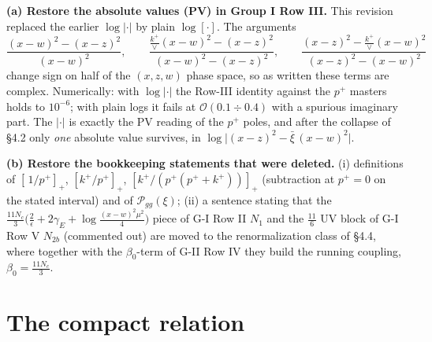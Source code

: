 \documentclass[11pt]{article}
\newcommand{\xib}{\bar{\xi}}
\begin{document}
\textbf{(a) Restore the absolute values (PV) in Group I Row III.}
This revision replaced the earlier $\log|\cdot|$ by plain $\log[\cdot]$. The arguments
\[
\frac{(x-w)^{2}-(x-z)^{2}}{(x-w)^{2}},\qquad
\frac{\frac{k^{+}}{\vee}(x-w)^{2}-(x-z)^{2}}{(x-w)^{2}-(x-z)^{2}},\qquad
\frac{(x-z)^{2}-\frac{k^{+}}{\vee}(x-w)^{2}}{(x-z)^{2}-(x-w)^{2}}
\]
change sign on half of the $(x,z,w)$ phase space, so as written these terms are complex.
Numerically: with $\log|\cdot|$ the Row-III identity against the $p^{+}$ masters holds to
$10^{-6}$; with plain logs it fails at $\mathcal O(0.1\div0.4)$ with a spurious imaginary
part. The $|\cdot|$ is exactly the PV reading of the $p^{+}$ poles, and after the collapse
of \S4.2 only \emph{one} absolute value survives, in
$\log\big|(x-z)^{2}-\xib\,(x-w)^{2}\big|$.

\textbf{(b) Restore the bookkeeping statements that were deleted.}
(i) definitions of $[\,1/p^{+}]_{+}$, $[k^{+}/p^{+}]_{+}$,
$[k^{+}/(p^{+}(p^{+}+k^{+}))]_{+}$ (subtraction at $p^{+}=0$ on the stated interval) and of
$\mathcal P_{gg}(\xi)$;
(ii) a sentence stating that the $\frac{11N_{c}}{3}\big(\frac2\epsilon+2\gamma_E+\log\frac{(x-w)^{2}\mu^{2}}{4}\big)$
piece of G-I Row II $N_{1}$ and the $\frac{11}{6}$ UV block of G-I Row V $N_{2b}$ (commented
out) are moved to the renormalization class of \S4.4, where together with the
$\beta_{0}$-term of G-II Row IV they build the running coupling, $\beta_{0}=\tfrac{11N_{c}}{3}$.

\section{The compact relation}
\end{document}

